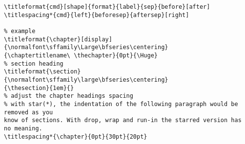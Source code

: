 \begin{lstlisting}
\titleformat{cmd}[shape]{format}{label}{sep}{before}[after]
\titlespacing*{cmd}{left}{beforesep}{aftersep}[right]

% example
\titleformat{\chapter}[display]
{\normalfont\sffamily\Large\bfseries\centering}
{\chaptertitlename\ \thechapter}{0pt}{\Huge}
% section heading
\titleformat{\section}
{\normalfont\sffamily\large\bfseries\centering}
{\thesection}{1em}{}
% adjust the chapter headings spacing
% with star(*), the indentation of the following paragraph would be removed as you
know of sections. With drop, wrap and run-in the starred version has no meaning.
\titlespacing*{\chapter}{0pt}{30pt}{20pt}
\end{lstlisting}


